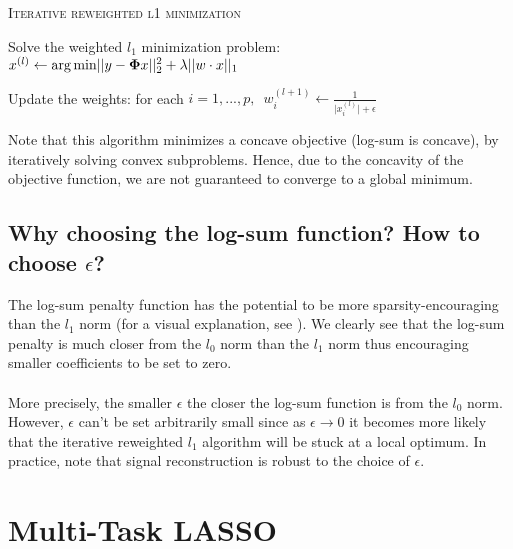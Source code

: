 \documentclass[a4paper,10pt]{article}
\theoremstyle{definition}
\begin{document}
\vskip 0.2in

{\fontsize{4}{4}\selectfont
\begin{algorithm}[h]  %
\caption{\textsc{Iterative reweighted l1 minimization}
}
%


    {
        Solve the weighted $l_1$ minimization problem: 
        $x^{(l)} \leftarrow \operatorname*{arg\,min} \lvert\lvert y -  \mathbf{\Phi} x\rvert\rvert_2^2 + \lambda \lvert\lvert w \cdot x\rvert\rvert_1$

        Update the weights: for each 
        $i = 1, ..., p, \enspace w_i^{(l+1)} \leftarrow \frac{1}{\lvert x_i^{(l)} \rvert + \epsilon}$
    }

\end{algorithm}
}

\vskip 0.2in

Note that this algorithm minimizes a concave objective (log-sum is concave), by iteratively solving convex subproblems. Hence, due to the concavity of the objective function, we
are not guaranteed to converge to a global minimum.

\subsection*{Why choosing the log-sum function? How to choose $\epsilon$?}

The log-sum penalty function has the potential to be more sparsity-encouraging than the $l_1$ norm (for a visual explanation, see \cite{Candes_Wakin_Boyd08}). We clearly see
that the log-sum penalty is much closer from the $l_0$ norm than the $l_1$ norm thus encouraging smaller coefficients to be set to zero.
\\
\\
More precisely, the smaller $\epsilon$ the closer the log-sum function is from the $l_0$ norm. However, $\epsilon$ can't be set arbitrarily small since as $\epsilon \rightarrow 0$ it
becomes more likely that the iterative reweighted $l_1$ algorithm will be stuck at a local optimum. In practice, note that signal reconstruction is robust to the choice of $\epsilon$.

\section{Multi-Task LASSO}
\label{section_4}
\end{document}

